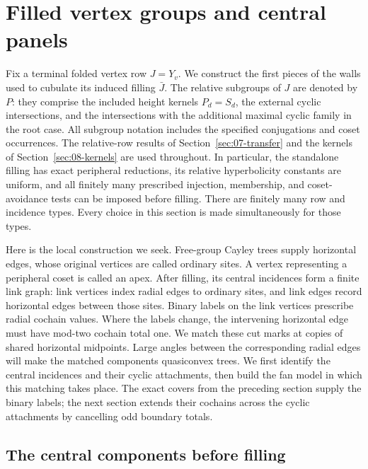 \section{Filled vertex groups and central panels}\label{sec:09-fans}

Fix a terminal folded vertex row $J=Y_v$.  We construct the first
pieces of the walls used to cubulate its induced filling $\bar J$.
The relative subgroups of $J$ are denoted by $P$: they comprise the
included height kernels $P_d=S_d$, the external cyclic intersections,
and the intersections with the additional maximal cyclic family in the
root case.  All subgroup notation includes the specified conjugations
and coset occurrences.  The relative-row results of
Section~\ref{sec:07-transfer} and the kernels of
Section~\ref{sec:08-kernels} are used throughout.  In particular, the
standalone filling has exact peripheral reductions, its relative
hyperbolicity constants are uniform, and all finitely many prescribed
injection, membership, and coset-avoidance tests can be imposed before
filling.  There are finitely many row and incidence types.  Every choice
in this section is made simultaneously for those types.

Here is the local construction we seek. Free-group Cayley trees supply
horizontal edges, whose original vertices are called ordinary sites.
A vertex representing a peripheral coset is called an apex. After filling,
its central incidences form a finite
link graph: link vertices index radial edges to ordinary sites, and link
edges record horizontal edges between those sites. Binary labels on the
link vertices prescribe radial cochain values. Where the labels change,
the intervening horizontal edge must have mod-two cochain total one. We
match these cut marks at copies of shared horizontal midpoints. Large
angles between the corresponding radial edges will make the matched
components quasiconvex trees.
We first identify the central incidences and their cyclic attachments,
then build the fan model in which this matching takes place. The exact
covers from the preceding section supply the binary labels; the next
section extends their cochains across the cyclic attachments by cancelling
odd boundary totals.

\subsection{The central components before filling}

